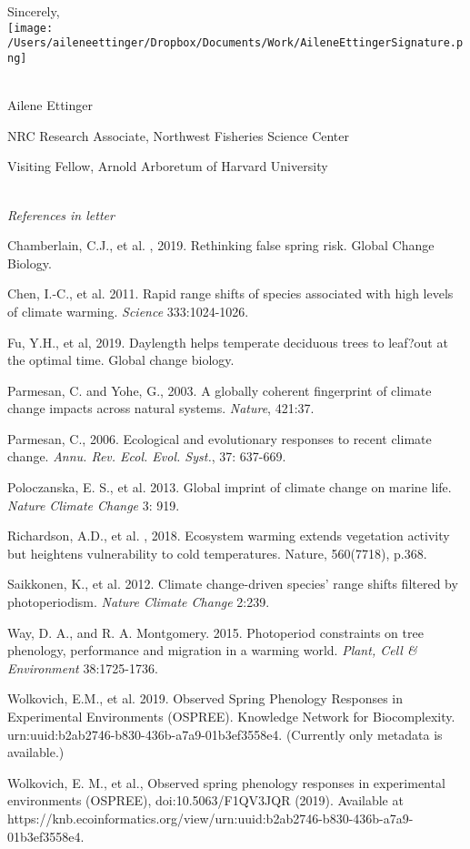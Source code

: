 \documentclass[10.7pt,a4paper]{letter}
\begin{document}
\begin{letter}{}
Sincerely,\\
\texttt{[image: /Users/aileneettinger/Dropbox/Documents/Work/AileneEttingerSignature.png]} \\

\\
\begin{footnotesize}
Ailene Ettinger

NRC Research Associate, Northwest Fisheries Science Center

Visiting Fellow, Arnold Arboretum of Harvard University
\end{footnotesize}
\\
\noindent \emph{References in letter}
\begin{footnotesize}

\item Chamberlain, C.J., et al. , 2019. Rethinking false spring risk. Global Change Biology.

\item Chen, I.-C., et al. 2011. Rapid range shifts of species associated with high levels of climate warming.  \emph{Science} 333:1024-1026.
\item Fu, Y.H., et al, 2019. Daylength helps temperate deciduous trees to leaf?out at the optimal time. Global change biology.

\item Parmesan, C. and Yohe, G., 2003. A globally coherent fingerprint of climate change impacts across natural systems.  \emph{Nature}, 421:37.

\item Parmesan, C., 2006. Ecological and evolutionary responses to recent climate change.  \emph{Annu. Rev. Ecol. Evol. Syst.}, 37: 637-669.

\item Poloczanska, E. S., et al. 2013. Global imprint of climate change on marine life. \emph{Nature Climate Change} 3: 919.

\item Richardson, A.D., et al. , 2018. Ecosystem warming extends vegetation activity but heightens vulnerability to cold temperatures. Nature, 560(7718), p.368.

\item Saikkonen, K., et al. 2012. Climate change-driven species' range shifts filtered by photoperiodism. \emph{Nature Climate Change} 2:239.

\item Way, D. A., and R. A. Montgomery. 2015. Photoperiod constraints on tree phenology, performance and migration in a warming world. \emph{Plant, Cell \& Environment} 38:1725-1736.
\item Wolkovich, E.M.,  et al. 2019. Observed Spring Phenology Responses in Experimental Environments (OSPREE). Knowledge Network for Biocomplexity. urn:uuid:b2ab2746-b830-436b-a7a9-01b3ef3558e4. (Currently only metadata is available.)
\item Wolkovich, E. M.,  et al., Observed spring phenology responses in experimental environments (OSPREE), doi:10.5063/F1QV3JQR (2019). Available at https://knb.ecoinformatics.org/view/urn:uuid:b2ab2746-b830-436b-a7a9-01b3ef3558e4.


\end{footnotesize}
\end{letter}
\end{document}
